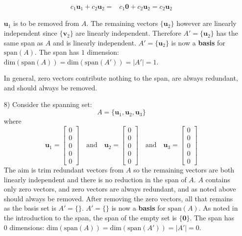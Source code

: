 \documentclass{article}
\begin{document}
\begin{itemize}
\begin{align*}   
c_1 \mathbf{u}_1 + c_2 \mathbf{u}_2  
= & c_1 \mathbf{0} + c_2 \mathbf{u}_2  
= c_2 \mathbf{u}_2 
\end{align*}   

\(\mathbf{u}_1\) is to be removed from \(A\). The remaining vectors \(\{\mathbf{u}_2\}\) however are linearly independent since \(\{\mathbf{v}_2\}\) are linearly independent. Therefore \(A' = \{\mathbf{u}_2\}\) has the same span as \(A\) and is linearly independent. \(A' = \{\mathbf{u}_2\}\) is now a {\bf basis} for \(\text{span}(A)\). The span has \(1\) dimension: \(\text{dim}(\text{span}(A)) = \text{dim}(\text{span}(A')) = |A'| = 1\).

In general, zero vectors contribute nothing to the span, are always redundant, and should always be removed.
\item[8)] Consider the spanning set:
\[A = \{\mathbf{u}_1, \mathbf{u}_2, \mathbf{u}_3\}\]
where
\[\mathbf{u}_1 = \begin{bmatrix}
0 \\ 0 \\ 0 \\ 0 \\ 0  
\end{bmatrix} \quad\text{and}\quad \mathbf{u}_2 =\begin{bmatrix} 
0 \\ 0 \\ 0 \\ 0 \\ 0
\end{bmatrix} \quad\text{and}\quad \mathbf{u}_3 =\begin{bmatrix} 
0 \\ 0 \\ 0 \\ 0 \\ 0
\end{bmatrix}\] 
The aim is trim redundant vectors from \(A\) so the remaining vectors are both linearly independent and there is no reduction in the span of \(A\). \(A\) contains only zero vectors, and zero vectors are always redundant, and as noted above should always be removed. After removing the zero vectors, all that remains as the basis set is \(A' = \{\}\). \(A' = \{\}\) is now a {\bf basis} for \(\text{span}(A)\). As noted in the introduction to the span, the span of the empty set is \(\{\mathbf{0}\}\). The span has \(0\) dimensions: \(\text{dim}(\text{span}(A)) = \text{dim}(\text{span}(A')) = |A'| = 0\).
\end{itemize}
\end{document}
